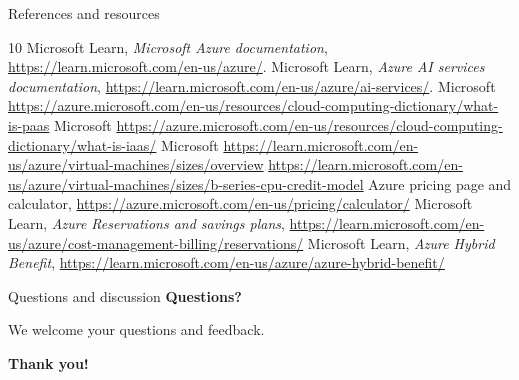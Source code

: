 \documentclass[aspectratio=169,xcolor=dvipsnames]{beamer}
\begin{document}
	\begin{frame}[shrink=10]{References and resources}
		\small
		\begin{thebibliography}{10}
			 Microsoft Learn, \emph{Microsoft Azure documentation}, \url{https://learn.microsoft.com/en-us/azure/}.
			 Microsoft Learn, \emph{Azure AI services documentation}, \url{https://learn.microsoft.com/en-us/azure/ai-services/}.
			 Microsoft \url{https://azure.microsoft.com/en-us/resources/cloud-computing-dictionary/what-is-paas}
			 Microsoft \url{https://azure.microsoft.com/en-us/resources/cloud-computing-dictionary/what-is-iaas/}
			 Microsoft \url{https://learn.microsoft.com/en-us/azure/virtual-machines/sizes/overview}
			 \url{https://learn.microsoft.com/en-us/azure/virtual-machines/sizes/b-series-cpu-credit-model}
			 Azure pricing page and calculator, \url{https://azure.microsoft.com/en-us/pricing/calculator/}
			 Microsoft Learn, \emph{Azure Reservations and savings plans}, \url{https://learn.microsoft.com/en-us/azure/cost-management-billing/reservations/}
			 Microsoft Learn, \emph{Azure Hybrid Benefit}, \url{https://learn.microsoft.com/en-us/azure/azure-hybrid-benefit/}
		\end{thebibliography}
	\end{frame}
	\begin{frame}{Questions and discussion}
		\centering
		{\LARGE\bfseries Questions?}
		\vspace{0.6cm}
		
		{\large We welcome your questions and feedback.}
	\end{frame}
	\begin{frame}[plain]
		\centering
		{\Huge\bfseries Thank you!}
	\end{frame}
\end{document}

